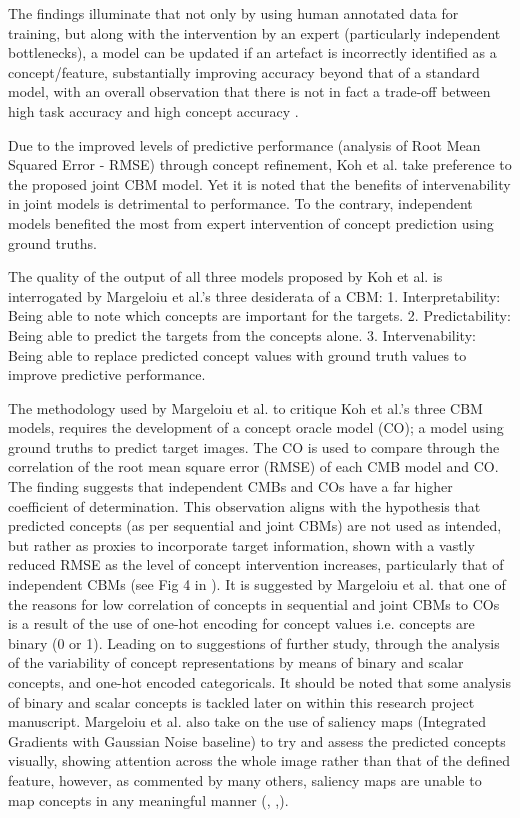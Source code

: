 The findings illuminate that not only by using human annotated data for training, but along with the intervention by an expert (particularly independent bottlenecks), a model can be updated if an artefact is incorrectly identified as a concept/feature, substantially improving accuracy beyond that of a standard model, with an overall observation that there is not in fact a trade-off between high task accuracy and high concept accuracy \cite{kohConceptBottleneckModels2020}.

Due to the improved levels of predictive performance (analysis of Root Mean Squared Error - RMSE) through concept refinement, Koh et al. take preference to the proposed joint CBM model. Yet it is noted that the benefits of intervenability in joint models is detrimental to performance. To the contrary, independent models benefited the most from expert intervention of concept prediction using ground truths.

The quality of the output of all three models proposed by Koh et al. is interrogated by Margeloiu et al.'s \cite{margeloiuConceptBottleneckModels2021} three desiderata of a CBM:
1.	Interpretability: Being able to note which concepts are important for the targets. 
2.	Predictability: Being able to predict the targets from the concepts alone. 
3.	Intervenability: Being able to replace predicted concept values with ground truth values to improve predictive performance.

The methodology used by Margeloiu et al. to critique Koh et al.’s three CBM models, requires the development of a concept oracle model (CO); a model using ground truths to predict target images. The CO is used to compare through the correlation of the root mean square error (RMSE) of each CMB model and CO. The finding suggests that independent CMBs and COs have a far higher coefficient of determination. This observation aligns with the hypothesis that predicted concepts (as per sequential and joint CBMs) are not used as intended, but rather as proxies to incorporate target information, shown with a vastly reduced RMSE as the level of concept intervention increases, particularly that of independent CBMs (see Fig 4 in \cite{kohConceptBottleneckModels2020}). It is suggested by Margeloiu et al. that one of the reasons for low correlation of concepts in sequential and joint CBMs to COs is a result of the use of one-hot encoding for concept values i.e. concepts are binary (0 or 1). Leading on to suggestions of further study, through the analysis of the variability of concept representations by means of binary and scalar concepts, and one-hot encoded categoricals. It should be noted that some analysis of binary and scalar concepts is tackled later on within this research project manuscript. Margeloiu et al. also take on the use of saliency maps (Integrated Gradients with Gaussian Noise baseline) to try and assess the predicted concepts visually, showing attention across the whole image rather than that of the defined feature, however, as commented by many others, saliency maps are unable to map concepts in any meaningful manner (\cite{rudinStopExplainingBlack2019}, \cite{adebayoSanityChecksSaliency2018a},\cite{kimInterpretabilityFeatureAttribution2018}).

